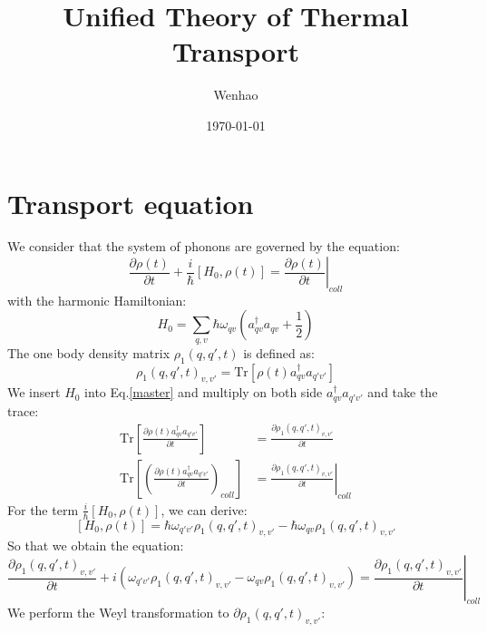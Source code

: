 \documentclass{article}
\begin{document}
\title{Unified Theory of Thermal Transport}
\author{Wenhao}
\date{\today}
\maketitle
\section{Transport equation}
We consider that the system of phonons are governed by the equation:
\begin{equation}
    \frac{\partial \rho(t)}{\partial t} + \frac{i}{\hbar} \left[H_0, \rho(t)\right] = \left. \frac{\partial\rho(t) }{\partial t} \right|_{coll} \label{master}
\end{equation}
with the harmonic Hamiltonian:
\begin{equation}
    H_0 = \sum_{q,v} \hbar \omega_{qv} \left( a^{\dagger}_{qv}a_{qv} + \frac{1}{2} \right)
\end{equation}
The one body density matrix $\rho_1(q,q',t)$ is defined as:
\begin{equation}
    \rho_1(q,q',t)_{v,v'} = \text{Tr}[\rho(t)a^{\dagger}_{qv}a_{q'v'}]
\end{equation}
We insert $H_0$ into Eq.\ref{master} and multiply on both side $a^{\dagger}_{qv}a_{q'v'}$ and take the trace:
\begin{align}
    \text{Tr}\left[ \frac{\partial \rho(t) a^{\dagger}_{qv}a_{q'v'} }{\partial t}  \right] &= \frac{\partial \rho_1(q,q',t)_{v,v'} }{\partial t} \\
    \text{Tr}\left[ \left( \frac{\partial\rho(t) a^{\dagger}_{qv}a_{q'v'} }{\partial t} \right) _{coll} \right] 
        &= \left. \frac{\partial \rho_1(q,q',t)_{v,v'} }{\partial t} \right|_{coll}
\end{align} 
For the term $\frac{i}{\hbar} \left[H_0, \rho(t)\right]$, we can derive:
\begin{equation}
    \left[H_0, \rho(t)\right] = \hbar \omega_{q'v'} \rho_1(q,q',t)_{v,v'} - \hbar \omega_{qv} \rho_1(q,q',t)_{v,v'} 
\end{equation}
So that we obtain the equation:
\begin{equation}
    \frac{\partial \rho_1(q,q',t)_{v,v'} }{\partial t} + i \left(\omega_{q'v'} \rho_1(q,q',t)_{v,v'} - \omega_{qv} \rho_1(q,q',t)_{v,v'}\right) 
     = \left. \frac{\partial \rho_1(q,q',t)_{v,v'} }{\partial t} \right|_{coll}  \label{derived1}
\end{equation}
We perform the Weyl transformation to $\partial \rho_1(q,q',t)_{v,v'}$:
\end{document}
